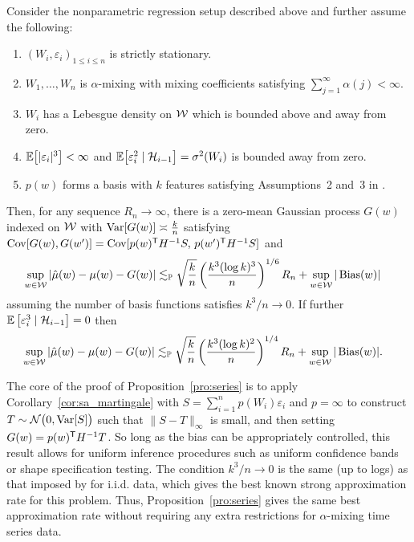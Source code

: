 \begin{proposition}%
  \label{pro:series}
  Consider the nonparametric regression setup described above
  and further assume the following:
  \begin{enumerate}[label=(\roman*)]

    \item
      $(W_i, \varepsilon_i)_{1 \leq i \leq n}$
      is strictly stationary.

    \item
      $W_1, \ldots, W_n$ is $\alpha$-mixing with mixing coefficients
      satisfying $\sum_{j=1}^\infty \alpha(j) < \infty$.

    \item
      $W_i$ has a Lebesgue density on $\mathcal{W}$
      which is bounded above and away from zero.

    \item
      $\mathbb{E}\big[|\varepsilon_i|^3 \big] < \infty$
      and
      $\mathbb{E}\big[\varepsilon_i^2 \mid \mathcal{H}_{i-1}\big]=\sigma^2(W_i)$
      is bounded away from zero.

    \item
      $p(w)$ forms a basis with $k$ features satisfying
      Assumptions~2 and~3 in \citet{cattaneo2020large}.

  \end{enumerate}
  Then, for any sequence $R_n \to \infty$,
  there is a zero-mean Gaussian process
  $G(w)$ indexed on $\mathcal{W}$
  with $\operatorname{Var}[G(w)] \asymp\frac{k}{n}$
  satisfying
  $\operatorname{Cov}[G(w), G(w')]
  = \operatorname{Cov}[p(w)^{\mathsf{T}} H^{-1} S,\, p(w')^{\mathsf{T}} H^{-1} S]$
  and
  \begin{align*}
    \sup_{w \in \mathcal{W}}
    \left| \hat\mu(w) - \mu(w) - G(w) \right|
    &\lesssim_{\mathbb{P}}
    \sqrt{\frac{k}{n}}
    \left( \frac{k^3 (\log k)^3}{n} \right)^{1/6} R_n
    + \sup_{w \in \mathcal{W}} |\operatorname{Bias}(w)|
  \end{align*}
  assuming the number of basis functions satisfies $k^3 / n \to 0$.
  If further $\mathbb{E} \left[ \varepsilon_i^3 \mid \mathcal{H}_{i-1} \right] = 0$ then
  \begin{align*}
    \sup_{w \in \mathcal{W}}
    \left| \hat\mu(w) - \mu(w) - G(w) \right|
    &\lesssim_{\mathbb{P}}
    \sqrt{\frac{k}{n}}
    \left( \frac{k^3 (\log k)^2}{n} \right)^{1/4} R_n
    + \sup_{w \in \mathcal{W}} |\operatorname{Bias}(w)|.
  \end{align*}
\end{proposition}

The core of the proof of Proposition~\ref{pro:series} is to apply
Corollary~\ref{cor:sa_martingale} with $S = \sum_{i=1}^n p(W_i) \varepsilon_i$
and $p=\infty$ to construct $T \sim \mathcal{N}\big(0, \operatorname{Var}[S]\big)$ such that
$\|S - T \|_\infty$ is small, and then setting $G(w) = p(w)^{\mathsf{T}} H^{-1} T$. So
long as the bias can be appropriately controlled, this result allows for
uniform inference procedures such as uniform confidence bands or shape
specification testing. The condition $k^3 / n \to 0$ is the same (up to logs)
as that imposed by \citet{cattaneo2020large} for i.i.d. data, which gives the
best known strong approximation rate for this problem. Thus,
Proposition~\ref{pro:series} gives the same best approximation rate without
requiring any extra restrictions for $\alpha$-mixing time series data.

